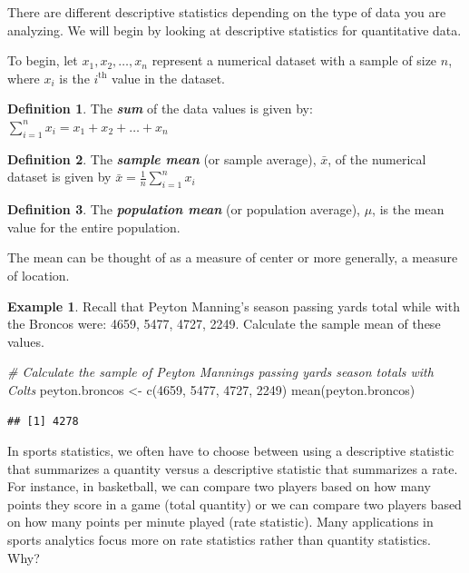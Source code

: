 \documentclass[
  11pt,
]{book}
\newenvironment{Shaded}{\begin{snugshade}}{\end{snugshade}}
\newcommand{\CommentTok}[1]{\textcolor[rgb]{0.56,0.35,0.01}{\textit{#1}}}
\newcommand{\DecValTok}[1]{\textcolor[rgb]{0.00,0.00,0.81}{#1}}
\newcommand{\FunctionTok}[1]{\textcolor[rgb]{0.00,0.00,0.00}{#1}}
\newcommand{\NormalTok}[1]{#1}
\newcommand{\OtherTok}[1]{\textcolor[rgb]{0.56,0.35,0.01}{#1}}
\theoremstyle{definition}
\newtheorem{definition}{Definition}[chapter]
\theoremstyle{definition}
\newtheorem{example}{Example}[chapter]
\theoremstyle{definition}
\theoremstyle{definition}
\theoremstyle{remark}
\begin{document}
There are different descriptive statistics depending on the type of data you are analyzing. We will begin by looking at descriptive statistics for quantitative data.

To begin, let \(x_1, x_2, \ldots, x_n\) represent a numerical dataset with a sample of size \(n\), where \(x_i\) is the \(i^\text{th}\) value in the dataset.

\begin{definition}
The \textbf{\emph{sum}} of the data values is given by: \(\sum_{i=1}^n x_i = x_1 + x_2 + \ldots + x_n\)
\end{definition}

\begin{definition}
The \textbf{\emph{sample mean}} (or sample average), \(\bar{x}\), of the numerical dataset is given by \(\bar{x} = \frac{1}{n} \sum_{i=1}^n x_i\)
\end{definition}

\begin{definition}
The \textbf{\emph{population mean}} (or population average), \(\mu\), is the mean value for the entire population.
\end{definition}

The mean can be thought of as a measure of center or more generally, a measure of location.

\begin{example}
Recall that Peyton Manning's season passing yards total while with the Broncos were: 4659, 5477, 4727, 2249. Calculate the sample mean of these values.
\end{example}

\hfill\break
\hfill\break
\hfill\break
\hfill\break
\hfill\break

\begin{Shaded}
\begin{Highlighting}[]
\CommentTok{\# Calculate the sample of Peyton Manning\textquotesingle{}s passing yards season totals with Colts}
\NormalTok{peyton.broncos }\OtherTok{\textless{}{-}} \FunctionTok{c}\NormalTok{(}\DecValTok{4659}\NormalTok{, }\DecValTok{5477}\NormalTok{, }\DecValTok{4727}\NormalTok{, }\DecValTok{2249}\NormalTok{)}
\FunctionTok{mean}\NormalTok{(peyton.broncos)}
\end{Highlighting}
\end{Shaded}

\begin{verbatim}
## [1] 4278
\end{verbatim}

In sports statistics, we often have to choose between using a descriptive statistic that summarizes a quantity versus a descriptive statistic that summarizes a rate. For instance, in basketball, we can compare two players based on how many points they score in a game (total quantity) or we can compare two players based on how many points per minute played (rate statistic). Many applications in sports analytics focus more on rate statistics rather than quantity statistics. Why?
\end{document}
